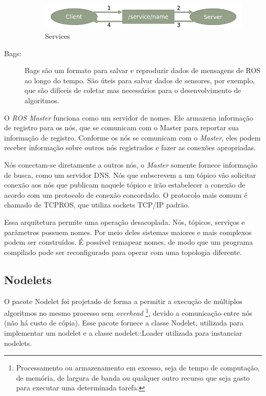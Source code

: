 \begin{description}
\begin{figure}[!h]
  \centering
  \includegraphics[width=0.7\linewidth]{./img/services.png}
  \caption{Services}
  \label{fig:services}
\end{figure}

\item[Bags:] Bags são um formato para salvar e reproduzir dados de mensagens de ROS ao longo do tempo. São úteis para salvar dados de sensores, por exemplo, que são difíceis de coletar mas necessários para o desenvolvimento de algoritmos. 
\end{description}

O \textit{ROS Master} funciona como um servidor de nomes. Ele armazena informação de registro para os nós, que se comunicam com o Master para reportar sua informação de registro. Conforme os nós se comunicam com o \textit{Master}, eles podem receber informação sobre outros nós registrados e fazer as conexões apropriadas. 

Nós conectam-se diretamente a outros nós, o \textit{Master} somente fornece informação de busca, como um servidor DNS. Nós que subscrevem a um tópico vão solicitar conexão aos nós que publicam naquele tópico e irão estabelecer a conexão de acordo com um protocolo de conexão concordado. O protocolo mais comum é chamado de TCPROS, que utiliza sockets TCP/IP padrão.

Essa arquitetura permite uma operação desacoplada. Nós, tópicos, serviços e parâmetros possuem nomes. Por meio deles sistemas maiores e mais complexos podem ser construídos. É possível remapear nomes, de modo que um programa compilado  pode ser reconfigurado para operar com uma topologia diferente. 


\subsection{Nodelets}
O pacote Nodelet foi projetado de forma a permitir a execução de múltiplos algoritmos no mesmo processo sem \textit{overhead} \footnote{Processamento ou armazenamento em excesso, seja de tempo de computação, de memória, de largura de banda ou qualquer outro recurso que seja gasto para executar uma determinada tarefa.}, devido a comunicação entre nós (não há custo de cópia). Esse pacote fornece a classe Nodelet, utilizada para implementar um nodelet e a classe nodelet::Loader utilizada para instanciar nodelets. 

